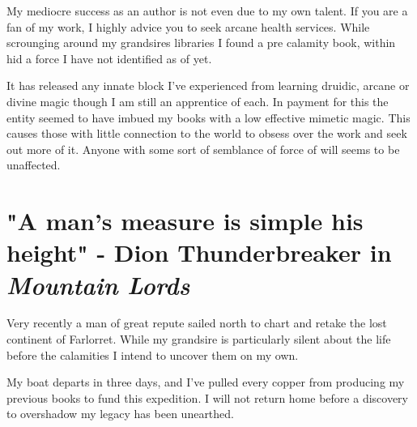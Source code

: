 \documentclass{article}
\begin{document}
My mediocre success as an author is not even due to my own talent. If you are a fan of my work, I highly advice you to seek arcane health services. While scrounging around my grandsires libraries I found a pre calamity book, within hid a force I have not identified as of yet.

It has released any innate block I've experienced from learning druidic, arcane or divine magic though I am still an apprentice of each. In payment for this the entity seemed to have imbued my books with a low effective mimetic magic. 
This causes those with little connection to the world to obsess over the work and seek out more of it. Anyone with some sort of semblance of force of will seems to be unaffected. 

\section*{"A man's measure is simple his height" - Dion Thunderbreaker in \textit{Mountain Lords}}

Very recently a man of great repute sailed north to chart and retake the lost continent of Farlorret. While my grandsire is particularly silent about the life before the calamities I intend to uncover them on my own. 

My boat departs in three days, and I've pulled every copper from producing my previous books to fund this expedition. I will not return home before a discovery to overshadow my legacy has been unearthed.
\end{document}
